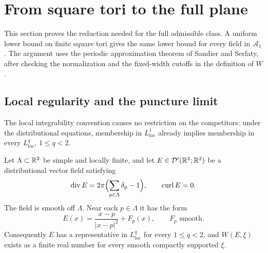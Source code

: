 \section{From square tori to the full plane}\label{red:section}\label{sec:reduction}

This section proves the reduction needed for the full admissible class.
A uniform lower bound on finite square tori gives the same lower bound
for every field in $\mathcal A_1$.  The argument uses the periodic
approximation theorem of Sandier and Serfaty, after checking the
normalization and the fixed-width cutoffs in the definition of $W$.

\subsection{Local regularity and the puncture limit}

The local integrability convention causes no restriction on the
competitors: under the distributional equations, membership in
$L^1_{\mathrm{loc}}$ already implies membership in every
$L^q_{\mathrm{loc}}$, $1\le q<2$.

\begin{lemma}\label{red:local}
Let $\Lambda\subset\mathbb R^2$ be simple and locally finite, and let
$E\in\mathcal D'(\mathbb R^2;\mathbb R^2)$ be a distributional vector field satisfying
\[
 \operatorname{div}E=2\pi\Bigl(\sum_{p\in\Lambda}\delta_p-1\Bigr),
 \qquad \operatorname{curl}E=0.
\]
The field is smooth off $\Lambda$.  Near each $p\in\Lambda$ it has
the form
\begin{equation}\label{red:local-expansion}
 E(x)=\frac{x-p}{|x-p|^2}+F_p(x),\qquad F_p\text{ smooth}.
\end{equation}
Consequently $E$ has a representative in $L^q_{\mathrm{loc}}$ for
every $1\le q<2$, and
$W(E,\xi)$ exists as a finite real number for every smooth compactly
supported $\xi$.
\end{lemma}

